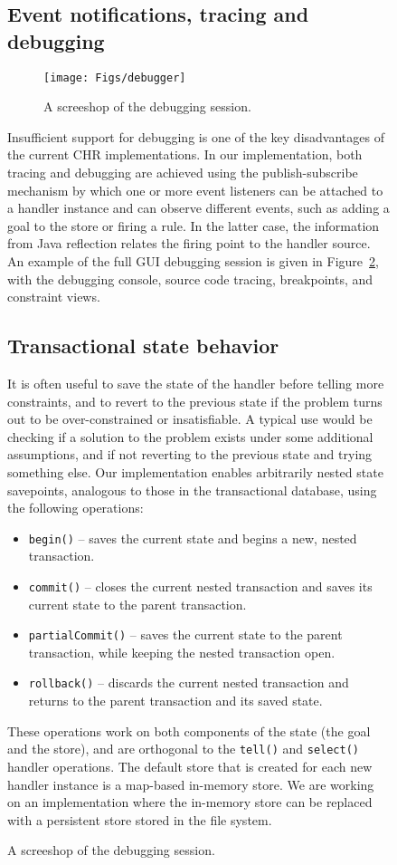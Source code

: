\documentclass[runningheads,a4paper,11pt,dvipsname]{llncs}
\begin{document}
\begin{figure}[tb]
\begin{minipage}[t]{0.75\textwidth}
\begin{tabbing}
\subsection{Event notifications, tracing and debugging}
\label{sec:event-notif-trac}

\begin{figure}[tb]
  \centering
  \texttt{[image: Figs/debugger]}
  \caption{A screeshop of the debugging session.}
  \label{fig:debug}
\end{figure}

Insufficient support for debugging is one of the key disadvantages of
the current CHR implementations.  In our implementation, both tracing
and debugging are achieved using the publish-subscribe mechanism by
which one or more event listeners can be attached to a handler
instance and can observe different events, such as adding a goal to
the store or firing a rule.  In the latter case, the information from
Java reflection relates the firing point to the handler source.  An
example of the full GUI debugging session is given in
Figure~\ref{fig:debug}, with the debugging console, source code
tracing, breakpoints, and constraint views.

\subsection{Transactional state behavior}
\label{sec:trans-state-behav}

It is often useful to save the state of the handler before telling
more constraints, and to revert to the previous state if the problem
turns out to be over-constrained or insatisfiable.  A typical use
would be checking if a solution to the problem exists under some
additional assumptions, and if not reverting to the previous state and
trying something else.  Our implementation enables arbitrarily nested
state savepoints, analogous to those in the transactional database,
using the following operations:
\begin{itemize}
\item \texttt{begin()} -- saves the current state and begins a new,
  nested transaction.
\item \texttt{commit()} -- closes the current nested transaction and
  saves its current state to the parent transaction.
\item \texttt{partialCommit()} -- saves the current state to the
  parent transaction, while keeping the nested transaction open.
\item \texttt{rollback()} -- discards the current nested transaction
  and returns to the parent transaction and its saved state.
\end{itemize}
These operations work on both components of the state (the goal and
the store), and are orthogonal to the \texttt{tell()} and
\texttt{select()} handler operations.  The default store that is
created for each new handler instance is a map-based in-memory store.
We are working on an implementation where the in-memory store can be
replaced with a persistent store stored in the file system.


\end{tabbing}
\end{minipage}
\end{figure}
\end{document}

